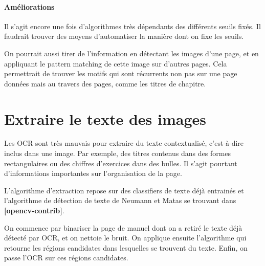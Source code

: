 \documentclass[a4paper, 12pt]{article}
\begin{document}
\paragraph{Améliorations}
Il s'agit encore une fois d'algorithmes très dépendants des différents seuils fixés. Il faudrait trouver des moyens d'automatiser la manière dont on fixe les seuils.

On pourrait aussi tirer de l'information en détectant les images d'une page, et en appliquant le pattern matching de cette image sur d'autres pages. Cela permettrait de trouver les motifs qui sont récurrents non pas sur une page données mais au travers des pages, comme les titres de chapitre.


\section{Extraire le texte des images}
Les OCR sont très mauvais pour extraire du texte contextualisé, c'est-à-dire inclus dans une image. Par exemple, des titres contenus dans des formes rectangulaires ou des chiffres d'exercices dans des bulles. Il s'agit pourtant d'informations importantes sur l'organisation de la page.

L'algorithme d'extraction repose sur des classifiers de texte déjà entrainés et l'algorithme de détection de texte de Neumann et Matas se trouvant dans \textbf{[opencv-contrib]}.

On commence par binariser la page de manuel dont on a retiré le texte déjà détecté par OCR, et on nettoie le bruit. On applique ensuite l'algorithme qui retourne les régions candidates dans lesquelles se trouvent du texte. Enfin, on passe l'OCR sur ces régions candidates.

\end{document}
